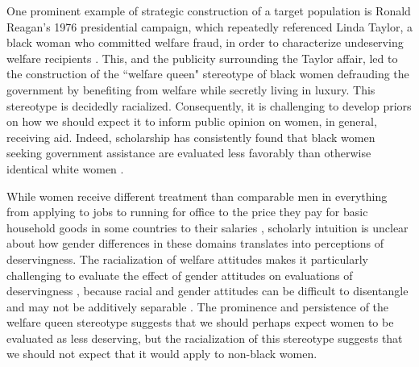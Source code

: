 \documentclass[12pt]{article}%
\begin{document}
\begin{doublespace}

One prominent example of strategic construction of a target population is Ronald Reagan's 1976 presidential campaign, which repeatedly referenced Linda Taylor, a black woman who committed welfare fraud, in order to characterize undeserving welfare recipients \citep{gilman2013return}. This, and the publicity surrounding the Taylor affair, led to the construction of the ``welfare queen" stereotype of black women defrauding the government by benefiting from welfare while secretly living in luxury. This stereotype is decidedly racialized. Consequently, it is challenging to develop priors on how we should expect it to inform public opinion on women, in general, receiving aid. Indeed, scholarship has consistently found that black women seeking government assistance are evaluated less favorably than otherwise identical white women \citep{gilliam_welfare_1999, desante_working_2013, hayes_2020, cassese2019intersectional, gilens_why_2000}.

While women receive different treatment than comparable men in everything from applying to jobs \citep{neumark_sex_1996, goldin_orchestrating_2000, quadlin_market} to running for office \citep{hassell_partys_2019, clayton_how_2020} to the price they pay for basic household goods in some countries \citep{betz_womens_2021} to their salaries \citep{castillo_gender_2013, mandel_up_2013}, scholarly intuition is unclear about how gender differences in these domains translates into perceptions of deservingness. The racialization of welfare attitudes makes it particularly challenging to evaluate the effect of gender attitudes on evaluations of deservingness \citep{winter_beyond_2006}, because racial and gender attitudes can be difficult to disentangle and may not be additively separable \cite{hayes2021race}. The prominence and persistence of the welfare queen stereotype suggests that we should perhaps expect women to be evaluated as less deserving, but the racialization of this stereotype suggests that we should not expect that it would apply to non-black women. 


\end{doublespace}
\end{document}
